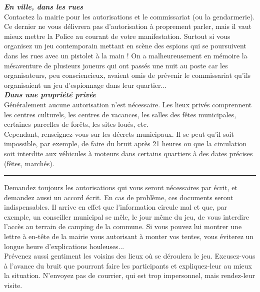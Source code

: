\documentclass[11pt,twoside,a4paper]{article}
\begin{document}
\begin{multicols*}{2}
\textbf{\textit{\large En ville, dans les rues}}~\\

Contactez la mairie pour les autorisations et le commissariat (ou la gendarmerie). Ce dernier ne vous d{\'e}livrera pas d'autorisation {\`a} proprement parler, mais il vaut mieux mettre la Police au courant de votre manifestation. Surtout si vous organisez un jeu contemporain mettant en sc{\`e}ne des espions qui se poursuivent dans les rues avec un pistolet {\`a} la main ! On a malheureusement en m{\'e}moire la m{\'e}saventure de plusieurs joueurs qui ont pass{\'e}s une nuit au poste car les organisateurs, peu consciencieux, avaient omis de pr{\'e}venir le commissariat qu'ils organisaient un jeu d'espionnage dans leur quartier... ~\\

\textbf{\textit{\large Dans une propri{\'e}t{\'e} priv{\'e}e}}~\\

G{\'e}n{\'e}ralement aucune autorisation n'est n{\'e}cessaire. Les lieux priv{\'e}s comprennent les centres culturels, les centres de vacances, les salles des f{\^e}tes municipales, certaines parcelles de for{\^e}ts, les sites lou{\'e}s, etc. ~\\

Cependant, renseignez-vous sur les d{\'e}crets municipaux. Il se peut qu'il soit impossible, par exemple, de faire du bruit apr{\`e}s 21 heures ou que la circulation soit interdite aux v{\'e}hicules {\`a} moteurs dans certains quartiers {\`a} des dates pr{\'e}cises (f{\^e}tes, march{\'e}s). %

\begin{center} \rule{0.45\textwidth}{0.01cm} \end{center}

Demandez toujours les autorisations qui vous seront n{\'e}cessaires par {\'e}crit, et demandez aussi un accord {\'e}crit. En cas de probl{\`e}me, ces documents seront indispensables. Il arrive en effet que l'information circule mal et que, par exemple, un conseiller municipal se m{\^e}le, le jour m{\^e}me du jeu, de vous interdire l'acc{\`e}s au terrain de camping de la commune. Si  vous pouvez lui montrer une lettre {\`a} en-t{\^e}te de la mairie vous autorisant {\`a} monter vos tentes, vous {\'e}viterez un longue heure d'explications houleuses... ~\\

Pr{\'e}venez aussi gentiment les voisins des lieux o{\`u} se d{\'e}roulera le jeu. Excusez-vous {\`a} l'avance du bruit que pourront faire les participants et expliquez-leur au mieux la situation. N'envoyez pas de courrier, qui est trop impersonnel, mais rendez-leur visite. ~\\


\end{multicols*}
\end{document}
